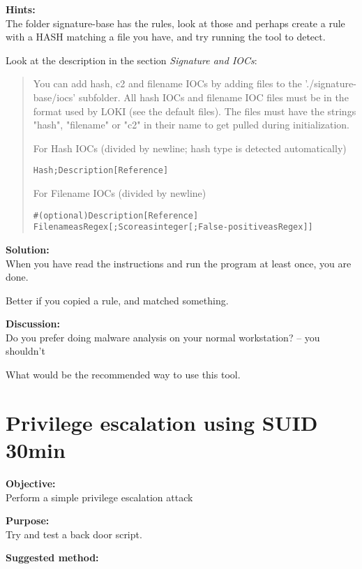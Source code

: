 \documentclass[a4paper,11pt,notitlepage]{report}
\begin{document}
{\bf Hints:}\\
The folder signature-base has the rules, look at those and perhaps create a rule with a HASH matching a file you have, and try running the tool to detect.

Look at the description in the section \emph{Signature and IOCs}:

\begin{quote}
You can add hash, c2 and filename IOCs by adding files to the './signature-base/iocs' subfolder. All hash IOCs and filename IOC files must be in the format used by LOKI (see the default files). The files must have the strings "hash", "filename" or "c2" in their name to get pulled during initialization.

For Hash IOCs (divided by newline; hash type is detected automatically)

\begin{alltt}
Hash;Description [Reference]
\end{alltt}

For Filename IOCs (divided by newline)
\begin{alltt}
# (optional) Description [Reference]
Filename as Regex[;Score as integer[;False-positive as Regex]]
\end{alltt}
\end{quote}

{\bf Solution:}\\
When you have read the instructions and run the program at least once, you are done.

Better if you copied a rule, and matched something.

{\bf Discussion:}\\
Do you prefer doing malware analysis on your normal workstation? -- you shouldn't

What would be the recommended way to use this tool.



\chapter{Privilege escalation using SUID 30min}
\label{ex:priv-esc-cron}

{\bf Objective:}\\
Perform a simple privilege escalation attack

{\bf Purpose:}\\
Try and test a back door script.

{\bf Suggested method:}\\
\end{document}

